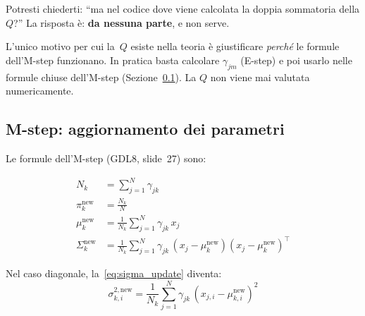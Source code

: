 \documentclass[11pt,a4paper]{article}
\newcommand{\refslide}[2]{\textsc{#1}, slide~#2}
\begin{document}
\begin{infobox}
Potresti chiederti: ``ma nel codice dove viene calcolata la doppia
sommatoria della $Q$?'' La risposta \`{e}: \textbf{da nessuna parte},
e non serve.

L'unico motivo per cui la~$Q$ esiste nella teoria \`{e} giustificare
\emph{perch\'{e}} le formule dell'M-step funzionano.
In pratica basta calcolare $\gamma_{jm}$ (E-step) e poi usarlo
nelle formule chiuse dell'M-step (Sezione~\ref{sec:em_mstep}).
La $Q$ non viene mai valutata numericamente.
\end{infobox}

\subsection{M-step: aggiornamento dei parametri}\label{sec:em_mstep}

Le formule dell'M-step (\refslide{GDL8}{27}) sono:

\begin{align}
  N_k &= \sum_{j=1}^{N} \gamma_{jk} \label{eq:Nk}\\
  \pi_k^{\text{new}} &= \frac{N_k}{N} \label{eq:pi_update}\\
  \mu_k^{\text{new}} &= \frac{1}{N_k}\sum_{j=1}^{N}
  \gamma_{jk}\, x_j \label{eq:mu_update}\\
  \Sigma_k^{\text{new}} &= \frac{1}{N_k}\sum_{j=1}^{N}
  \gamma_{jk}\,(x_j - \mu_k^{\text{new}})
  (x_j - \mu_k^{\text{new}})^\top \label{eq:sigma_update}
\end{align}

Nel caso diagonale, la~\eqref{eq:sigma_update} diventa:
\begin{equation}\label{eq:sigma_diag}
  \sigma_{k,i}^{2,\text{new}} = \frac{1}{N_k}\sum_{j=1}^{N}
  \gamma_{jk}\,(x_{j,i} - \mu_{k,i}^{\text{new}})^2
\end{equation}
\end{document}
